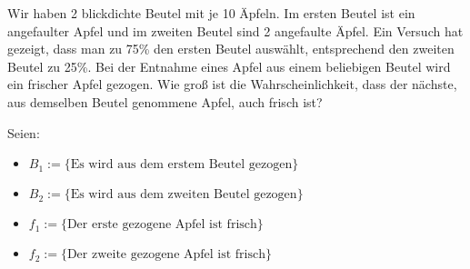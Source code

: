 \documentclass{abgabe}
\begin{document}
\begin{questions}
    \question
    Wir  haben 2 blickdichte  Beutel  mit  je 10 Äpfeln.  
    Im  ersten  Beutel  ist  ein  angefaulter Apfel und im zweiten Beutel sind 2 angefaulte Äpfel. 
    Ein Versuch hat gezeigt, dass man zu 75\% den  ersten  Beutel  auswählt,  entsprechend  den  zweiten  Beutel  zu 25\%.  
    Bei  der Entnahme eines Apfel aus einem beliebigen Beutel wird ein frischer Apfel gezogen. 
    Wie groß  ist  die  Wahrscheinlichkeit,  dass  der  nächste,  aus  demselben  Beutel  genommene Apfel, auch frisch ist?
    \begin{solution}
        Seien: 
        \begin{itemize}
            \item $B_1 := \{ \text{Es wird aus dem erstem Beutel gezogen} \}$
            \item $B_2 := \{ \text{Es wird aus dem zweiten Beutel gezogen} \}$
            \item $f_1 := \{ \text{Der erste gezogene Apfel ist frisch} \}$
            \item $f_2 := \{ \text{Der zweite gezogene Apfel ist frisch} \}$
        \end{itemize}
        

\end{solution}
\end{questions}
\end{document}
